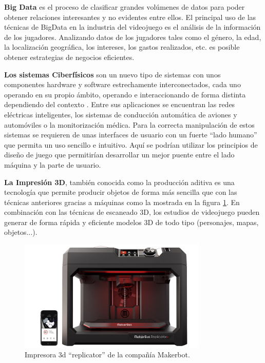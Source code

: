 \textbf{Big Data} es el proceso de clasificar grandes volúmenes de datos para poder obtener relaciones interesantes y no evidentes entre ellos. El principal uso de las técnicas de BigData en la industria del videojuego es el análisis de la información de los jugadores. Analizando datos de los jugadores tales como el género, la edad, la localización geográfica, los intereses, los gastos realizados, etc. es posible obtener estrategias de negocios eficientes.

\textbf{Los sistemas Ciberfísicos} son un nuevo tipo de sistemas con unos componentes hardware y software estrechamente interconectados, cada uno operando en su propio ámbito, operando e interaccionando de forma distinta dependiendo del contexto \cite{cyber_physics}. Entre sus aplicaciones se encuentran las redes eléctricas inteligentes, los sistemas de conducción automática de aviones y automóviles o la monitorización médica. Para la correcta manipulación de estos sistemas se requieren de unas interfaces de usuario con un fuerte ``lado humano'' que permita un uso sencillo e intuitivo. Aquí se podrían utilizar los principios de diseño de juego que permitirían desarrollar un mejor puente entre el lado máquina y la parte de usuario.

\textbf{La Impresión 3D}, también conocida como la producción aditiva es una tecnología que permite producir objetos de forma más sencilla que con las técnicas anteriores gracias a máquinas como la mostrada en la figura \ref{impresion-3d}. En combinación con las técnicas de escaneado 3D, los estudios de videojuego pueden generar de forma rápida y eficiente modelos 3D de todo tipo (personajes, mapas, objetos...).

\begin{figure}[h]
    \centering
    \includegraphics[width=0.8\textwidth]{images/estadodelarte/mercado/impresion-3d}
    \caption{Impresora 3d ``replicator'' de la compañía Makerbot.}
    \label{impresion-3d}
\end{figure}

